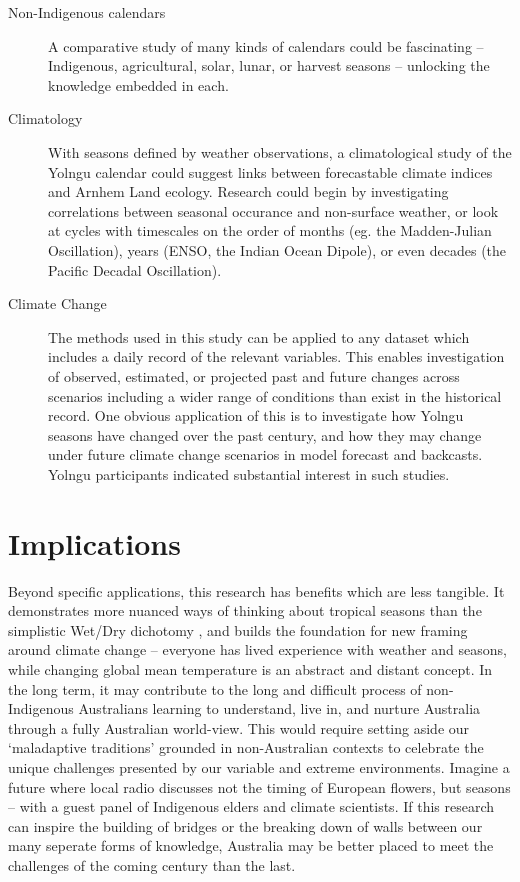 \begin{description}
\item[Non-Indigenous calendars]
    A comparative study of many kinds of calendars could be fascinating --
    Indigenous, agricultural, solar, lunar, or harvest seasons -- unlocking
    the knowledge embedded in each.

\item[Climatology]
    With seasons defined by weather observations, a climatological study of the
    Yolngu calendar could suggest links between forecastable climate indices
    and Arnhem Land ecology.  Research could begin by investigating correlations
    between seasonal occurance and non-surface weather, or look at cycles with
    timescales on the order of months (eg. the Madden-Julian Oscillation), years (ENSO,
    the Indian Ocean Dipole), or even decades (the Pacific Decadal Oscillation).

\item[Climate Change]
    The methods used in this study can be applied to any dataset which
    includes a daily record of the relevant variables.  This enables
    investigation of observed, estimated, or projected past and future changes
    across scenarios including a wider range of conditions than exist in the historical record.
    One obvious application of this is to investigate how Yolngu seasons have
    changed over the past century, and how they may change under future climate
    change scenarios in model forecast and backcasts.  Yolngu participants
    indicated substantial interest in such studies.
\end{description}


\clearpage
\section{Implications}

Beyond specific applications, this research has benefits which are less tangible.
It demonstrates more nuanced ways of thinking about tropical seasons than the
simplistic Wet/Dry dichotomy \citep{willmett2009}, and builds the foundation
for new framing around climate change -- everyone has lived experience with
weather and seasons, while changing global mean temperature is an abstract and
distant concept.
%
In the long term, it may contribute to the long and difficult process of
non-Indigenous Australians learning to understand, live in, and nurture
Australia through a fully Australian world-view.  This would require setting
aside our `maladaptive traditions' grounded in non-Australian contexts
\citep{flannery1994} to celebrate the unique challenges presented by our variable and extreme
environments.  Imagine a future where local radio discusses not the timing of
European flowers, but seasons -- with a guest panel of Indigenous elders and
climate scientists.
%
If this research can inspire the building of bridges or the breaking down of walls
between our many seperate forms of knowledge, Australia may be better placed
to meet the challenges of the coming century than the last.


